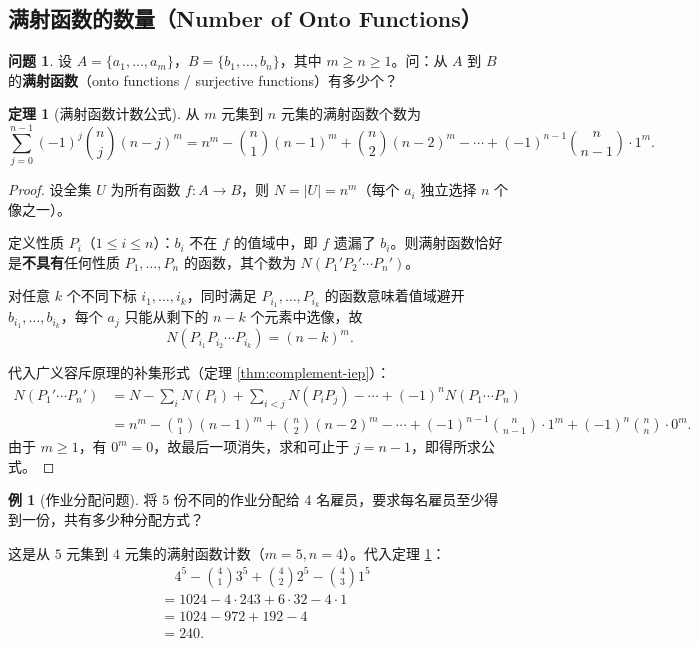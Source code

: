 \documentclass[UTF8,11pt,a4paper]{ctexbook}   %
\theoremstyle{definition}
\newtheorem{theorem}{定理}[section]
\newtheorem{example}{例}[section]
\newtheorem{problem}{问题}[section]
\begin{document}
\subsection{满射函数的数量（Number of Onto Functions）}

\begin{problem}
设 $A=\{a_1,\dots,a_m\}$，$B=\{b_1,\dots,b_n\}$，其中 $m\ge n\ge 1$。问：从 $A$ 到 $B$ 的\textbf{满射函数}（onto functions / surjective functions）有多少个？
\end{problem}

\begin{theorem}[满射函数计数公式]\label{thm:onto-functions}
从 $m$ 元集到 $n$ 元集的满射函数个数为
\[
\boxed{\sum_{j=0}^{n-1}(-1)^j\binom{n}{j}(n-j)^m
= n^m - \binom{n}{1}(n-1)^m + \binom{n}{2}(n-2)^m - \cdots + (-1)^{n-1}\binom{n}{n-1}\cdot 1^m.}
\]
\end{theorem}

\begin{proof}
设全集 $U$ 为所有函数 $f:A\to B$，则 $N=|U|=n^m$（每个 $a_i$ 独立选择 $n$ 个像之一）。

定义性质 $P_i$（$1\le i\le n$）：$b_i$ 不在 $f$ 的值域中，即 $f$ 遗漏了 $b_i$。则满射函数恰好是\textbf{不具有}任何性质 $P_1,\dots,P_n$ 的函数，其个数为 $N(P_1'P_2'\cdots P_n')$。

对任意 $k$ 个不同下标 $i_1,\dots,i_k$，同时满足 $P_{i_1},\dots,P_{i_k}$ 的函数意味着值域避开 $b_{i_1},\dots,b_{i_k}$，每个 $a_j$ 只能从剩下的 $n-k$ 个元素中选像，故
\[
N(P_{i_1}P_{i_2}\cdots P_{i_k})=(n-k)^m.
\]

代入广义容斥原理的补集形式（定理 \ref{thm:complement-iep}）：
\begin{align*}
N(P_1'\cdots P_n')
&= N - \sum_{i}N(P_i) + \sum_{i<j}N(P_iP_j) - \cdots + (-1)^n N(P_1\cdots P_n)\\
&= n^m - \binom{n}{1}(n-1)^m + \binom{n}{2}(n-2)^m - \cdots + (-1)^{n-1}\binom{n}{n-1}\cdot 1^m + (-1)^n\binom{n}{n}\cdot 0^m.
\end{align*}
由于 $m\ge 1$，有 $0^m=0$，故最后一项消失，求和可止于 $j=n-1$，即得所求公式。
\end{proof}

\begin{example}[作业分配问题]
将 $5$ 份不同的作业分配给 $4$ 名雇员，要求每名雇员至少得到一份，共有多少种分配方式？

这是从 $5$ 元集到 $4$ 元集的满射函数计数（$m=5,n=4$）。代入定理 \ref{thm:onto-functions}：
\begin{align*}
&\quad 4^5 - \binom{4}{1}3^5 + \binom{4}{2}2^5 - \binom{4}{3}1^5\\
&= 1024 - 4\cdot 243 + 6\cdot 32 - 4\cdot 1\\
&= 1024 - 972 + 192 - 4\\
&= \boxed{240}.
\end{align*}
\end{example}
\end{document}
